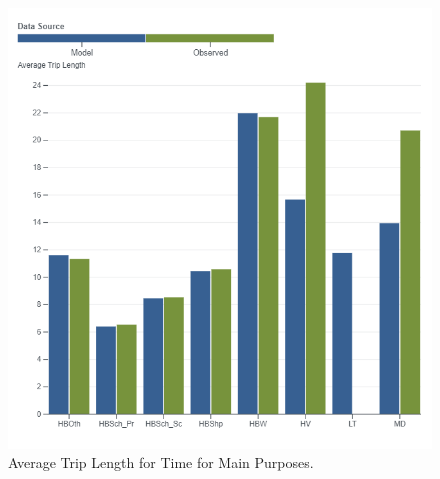 \documentclass[
  letterpaper,
  DIV=11,
  numbers=noendperiod]{scrreprt}
\begin{document}
\begin{figure}[H]

{\centering \includegraphics[width=\textwidth,height=0.4\textheight]{v9x/v900/validation/_pictures/5-plot7.png}

}

\caption{\label{fig-pdf-time-purp}Average Trip Length for Time for Main
Purposes.}

\end{figure}
\end{document}
